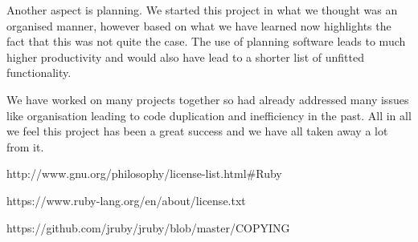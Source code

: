 \documentclass[a4wide, 11pt]{article}
\begin{document}
Another aspect is planning. We started this project in what we thought was an organised manner, however based on what we have learned now highlights the fact that this was not quite the case. The use of planning software leads to much higher productivity and would also have lead to a shorter list of unfitted functionality. 

We have worked on many projects together so had already addressed many issues like organisation leading to code duplication and inefficiency in the past. All in all we feel this project has been a great success and we have all taken away a lot from it.

\begin{thebibliography}{9}

  http://www.gnu.org/philosophy/license-list.html\#Ruby

  https://www.ruby-lang.org/en/about/license.txt

  https://github.com/jruby/jruby/blob/master/COPYING
\end{thebibliography}
\end{document}
